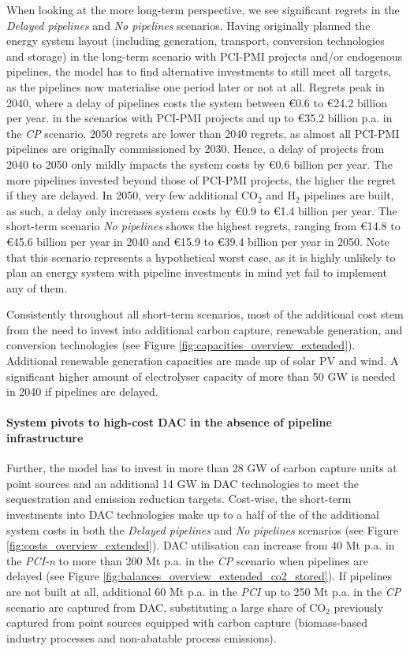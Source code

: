 \documentclass[pdflatex,sn-nature]{sn-jnl}%
\theoremstyle{thmstyleone}%
\theoremstyle{thmstyletwo}%
\theoremstyle{thmstylethree}%
\begin{document}
When looking at the more long-term perspective, we see significant regrets in the \textit{Delayed pipelines} and \textit{No pipelines} scenarios. Having originally planned the energy system layout (including generation, transport, conversion technologies and storage) in the long-term scenario with PCI-PMI projects and/or endogenous pipelines, the model has to find alternative investments to still meet all targets, as the pipelines now materialise one period later or not at all. Regrets peak in 2040, where a delay of pipelines costs the system between €0.6 to €24.2 billion per year. in the scenarios with PCI-PMI projects and up to €35.2 billion p.a. in the \textit{CP} scenario. 2050 regrets are lower than 2040 regrets, as almost all PCI-PMI pipelines are originally commissioned by 2030. Hence, a delay of projects from 2040 to 2050 only mildly impacts the system costs by €0.6 billion per year. The more pipelines invested beyond those of PCI-PMI projects, the higher the regret if they are delayed. In 2050, very few additional CO$_2$ and H$_2$ pipelines are built, as such, a delay only increases system costs by €0.9 to €1.4 billion per year. 
The short-term scenario \textit{No pipelines} shows the highest regrets, ranging from €14.8 to €45.6 billion per year in 2040 and €15.9 to €39.4 billion per year in 2050. Note that this scenario represents a hypothetical worst case, as it is highly unlikely to plan an energy system with pipeline investments in mind yet fail to implement any of them.

Consistently throughout all short-term scenarios, most of the additional cost stem from the need to invest into additional carbon capture, renewable generation, and conversion technologies (see Figure \ref{fig:capacities_overview_extended}). Additional renewable generation capacities are made up of solar PV and wind. A significant higher amount of electrolyser capacity of more than 50 GW is needed in 2040 if pipelines are delayed. 

\paragraph{System pivots to high-cost DAC in the absence of pipeline infrastructure}
Further, the model has to invest in more than 28 GW of carbon capture units at point sources and an additional 14 GW in DAC technologies to meet the sequestration and emission reduction targets. Cost-wise, the short-term investments into DAC technologies make up to a half of the of the additional system costs in both the \textit{Delayed pipelines} and \textit{No pipelines} scenarios (see Figure \ref{fig:costs_overview_extended}). DAC utilisation can increase from 40 Mt p.a. in the \textit{PCI-n} to more than 200 Mt p.a. in the \textit{CP} scenario when pipelines are delayed (see Figure \ref{fig:balances_overview_extended_co2_stored}). If pipelines are not built at all, additional 60 Mt p.a. in the \textit{PCI} up to 250 Mt p.a. in the \textit{CP} scenario are captured from DAC, substituting a large share of CO$_2$ previously captured from point sources equipped with carbon capture (biomass-based industry processes and non-abatable process emissions).
\end{document}
